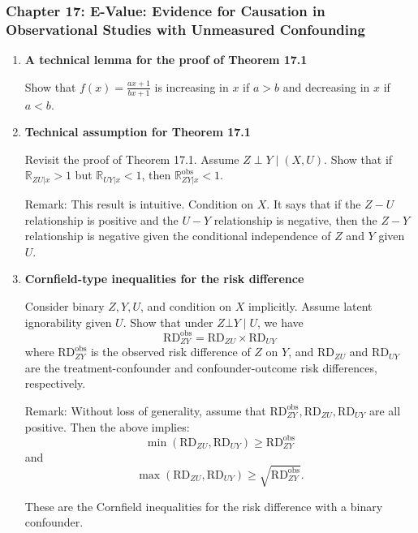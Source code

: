 \documentclass[11pt]{article}
\begin{document}
\subsubsection*{Chapter 17: E-Value: Evidence for Causation in Observational Studies with Unmeasured Confounding}

\begin{enumerate}[label=\textbf{17.\arabic*}]

\item[\textbf{17.1}] \textbf{A technical lemma for the proof of Theorem 17.1}

Show that $f(x) = \frac{ax + 1}{bx + 1}$ is increasing in $x$ if $a > b$ and decreasing in $x$ if $a < b$.

\item[\textbf{17.2}] \textbf{Technical assumption for Theorem 17.1}

Revisit the proof of Theorem 17.1. Assume $Z \perp Y \mid (X, U)$. Show that if $\mathbb{R}_{ZU|x} > 1$ but $\mathbb{R}_{UY|x} < 1$, then $\mathbb{R}_{ZY|x}^{\mathrm{obs}} < 1$.

Remark: This result is intuitive. Condition on $X$. It says that if the $Z-U$ relationship is positive and the $U-Y$ relationship is negative, then the $Z-Y$ relationship is negative given the conditional independence of $Z$ and $Y$ given $U$.

\item[\textbf{17.6}] \textbf{Cornfield-type inequalities for the risk difference}

Consider binary $Z, Y, U$, and condition on $X$ implicitly. Assume latent ignorability given $U$. Show that under $Z \bot Y \mid U$, we have
\[
\mathrm{RD}_{ZY}^{\mathrm{obs}} = \mathrm{RD}_{ZU} \times \mathrm{RD}_{UY}
\]
where $\mathrm{RD}_{ZY}^{\mathrm{obs}}$ is the observed risk difference of $Z$ on $Y$, and $\mathrm{RD}_{ZU}$ and $\mathrm{RD}_{UY}$ are the treatment-confounder and confounder-outcome risk differences, respectively.

Remark: Without loss of generality, assume that $\mathrm{RD}_{ZY}^{\mathrm{obs}}, \mathrm{RD}_{ZU}, \mathrm{RD}_{UY}$ are all positive. Then the above implies:
\[
\min(\mathrm{RD}_{ZU}, \mathrm{RD}_{UY}) \geq \mathrm{RD}_{ZY}^{\mathrm{obs}}
\]
and
\[
\max(\mathrm{RD}_{ZU}, \mathrm{RD}_{UY}) \geq \sqrt{\mathrm{RD}_{ZY}^{\mathrm{obs}}}.
\]

These are the Cornfield inequalities for the risk difference with a binary confounder.

\end{enumerate}
\end{document}
